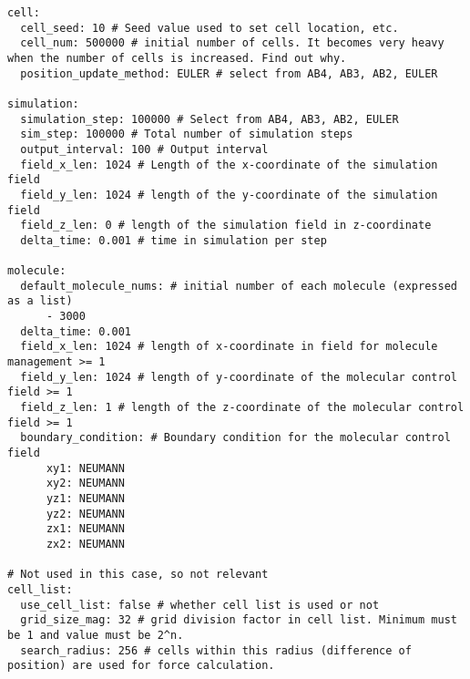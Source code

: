 \documentclass[vipdfmx,a4paper,11pt]{jsarticle}
\begin{document}
\begin{lstlisting}[caption=config.yaml]
cell:
  cell_seed: 10 # Seed value used to set cell location, etc.
  cell_num: 500000 # initial number of cells. It becomes very heavy when the number of cells is increased. Find out why.
  position_update_method: EULER # select from AB4, AB3, AB2, EULER

simulation:
  simulation_step: 100000 # Select from AB4, AB3, AB2, EULER
  sim_step: 100000 # Total number of simulation steps
  output_interval: 100 # Output interval
  field_x_len: 1024 # Length of the x-coordinate of the simulation field
  field_y_len: 1024 # length of the y-coordinate of the simulation field
  field_z_len: 0 # length of the simulation field in z-coordinate
  delta_time: 0.001 # time in simulation per step

molecule:
  default_molecule_nums: # initial number of each molecule (expressed as a list)
      - 3000
  delta_time: 0.001
  field_x_len: 1024 # length of x-coordinate in field for molecule management >= 1
  field_y_len: 1024 # length of y-coordinate of the molecular control field >= 1
  field_z_len: 1 # length of the z-coordinate of the molecular control field >= 1
  boundary_condition: # Boundary condition for the molecular control field
      xy1: NEUMANN
      xy2: NEUMANN
      yz1: NEUMANN
      yz2: NEUMANN
      zx1: NEUMANN
      zx2: NEUMANN

# Not used in this case, so not relevant
cell_list:
  use_cell_list: false # whether cell list is used or not
  grid_size_mag: 32 # grid division factor in cell list. Minimum must be 1 and value must be 2^n.
  search_radius: 256 # cells within this radius (difference of position) are used for force calculation.
\end{lstlisting}
\end{document}
